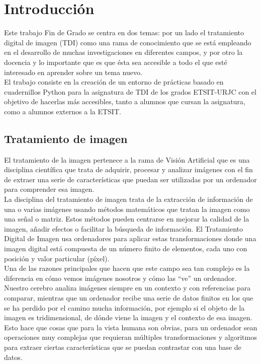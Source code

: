 \chapter{Introducción}

Este trabajo Fin de Grado se centra en dos temas: por un lado el tratamiento digital de imagen (TDI) como una rama de conocimiento que se está empleando en el desarrollo de muchas investigaciones en diferentes campos, y por otro la docencia y lo importante que es que ésta sea accesible a todo el que esté interesado en aprender sobre un tema nuevo.\\ 

El trabajo consiste en la creación de un entorno de prácticas basado en cuadernillos Python para la asignatura de TDI de los grados ETSIT-URJC con el objetivo de hacerlas más accesibles, tanto a alumnos que cursan la asignatura, como a alumnos externos a la ETSIT.\\



\section{Tratamiento de imagen}

El tratamiento de la imagen pertenece a la rama de Visión Artificial que es una disciplina científica que trata de adquirir, procesar y analizar imágenes con el fin de extraer una serie de características que puedan ser utilizadas por un ordenador para comprender esa imagen.\\

La disciplina del tratamiento de imagen trata de la extracción de información de una o varias imágenes usando métodos matemáticos que tratan la imagen como una señal o matriz. Estos métodos pueden centrarse en mejorar la calidad de la imagen, añadir efectos o facilitar la búsqueda de información. El Tratamiento Digital de Imagen usa ordenadores para aplicar estas transformaciones donde una imagen digital está compuesta de un número finito de elementos, cada uno con posición y valor particular (píxel)\cite{Historia2}.\\

Una de las razones principales que hacen que este campo sea tan complejo es la diferencia en cómo vemos imágenes nosotros y cómo las ``ve'' un ordenador. Nuestro cerebro analiza imágenes siempre en un contexto y con referencias para comparar, mientras que un ordenador recibe una serie de datos finitos en los que se ha perdido por el camino mucha información, por ejemplo si el objeto de la imagen es tridimensional, de dónde viene la imagen y el contexto de esa imagen. Esto hace que cosas que para la vista humana son obvias, para un ordenador sean operaciones muy complejas que requieran múltiples transformaciones y algoritmos para extraer ciertas características que se puedan contrastar con una base de datos.\\

